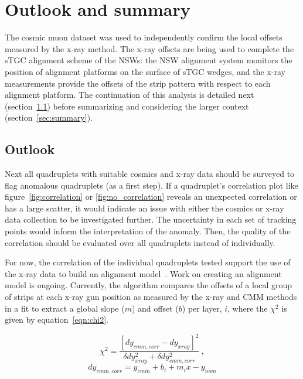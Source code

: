 
\chapter{Outlook and summary}
\label{chap:outlook_and_summary}

The cosmic muon dataset was used to independently confirm the local offsets measured by the x-ray method. The x-ray offsets are being used to complete the sTGC alignment scheme of the NSWs: the NSW alignment system monitors the position of alignment platforms on the surface of sTGC wedges, and the x-ray measurements provide the offsets of the strip pattern with respect to each alignment platform. The continuation of this analysis is detailed next (section~\ref{sec:outlook}) before summarizing and considering the larger context (section~\ref{sec:summary}). 

\section{Outlook}
\label{sec:outlook}

Next all quadruplets with suitable cosmics and x-ray data should be surveyed to flag anomalous quadruplets (as a first step). If a quadruplet's correlation plot like figure~\ref{fig:correlation} or \ref{fig:no_correlation} reveals an unexpected correlation or has a large scatter, it would indicate an issue with either the cosmics or x-ray data collection to be investigated further. The uncertainty in each set of tracking points would inform the interpretation of the anomaly. Then, the quality of the correlation should be evaluated over all quadruplets instead of individually. 
 
For now, the correlation of the individual quadruplets tested support the use of the x-ray data to build an alignment model~\cite{lefebvre_precision_2020}. Work on creating an alignment model is ongoing. Currently, the algorithm compares the offsets of a local group of strips at each x-ray gun position as measured by the x-ray and CMM methods in a fit to extract a global slope ($m$) and offset ($b$) per layer, $i$, where the $\chi^2$ is given by equation~\ref{eqn:chi2}.

\begin{equation}
    \chi^2 = \frac{\left[dy_{cmm, corr} - dy_{xray}\right]^2}{\delta dy_{xray}^2 + \delta dy_{cmm, corr}^2}\:,
    \label{eqn:chi2}  
\end{equation}
\begin{equation}
    dy_{cmm, corr} = y_{cmm} + b_i + m_{i}x - y_{nom}
    \label{eqn:dy_cmm_corr}
\end{equation}

